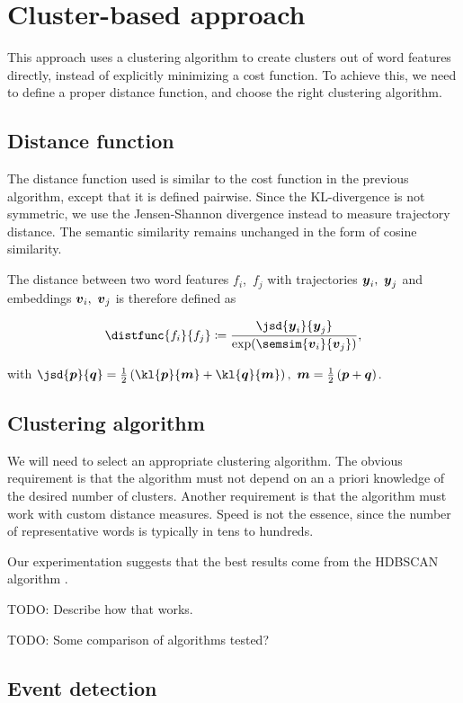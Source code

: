 \section{Cluster-based approach}
This approach uses a clustering algorithm to create clusters out of word features directly, instead of explicitly minimizing a cost function. To achieve this, we need to define a proper distance function, and choose the right clustering algorithm.

\subsection{Distance function}
The distance function used is similar to the cost function in the previous algorithm, except that it is defined pairwise. Since the KL-divergence is not symmetric, we use the Jensen-Shannon divergence instead to measure trajectory distance. The semantic similarity remains unchanged in the form of cosine similarity.

The distance between two word features $f_{i}$,\ $f_{j}$ with trajectories $\vect{\traj}_{i},\ \vect{\traj}_{j}$ and embeddings $\embed_{i},\ \embed_{j}$ is therefore defined as

\begin{equation}
	\distfunc{f_{i}}{f_{j}} \coloneqq \frac{\jsd{\vect{\traj}_{i}}{\vect{\traj}_{j}}}{\exp(\semsim{\embed_{i}}{\embed_{j}})},
\end{equation}

with $\jsd{\vect{p}}{\vect{q}} = \frac{1}{2} \left( \kl{\vect{p}}{\vect{m}} + \kl{\vect{q}}{\vect{m}} \right) ,\ \vect{m} = \frac{1}{2} \left( \vect{p} + \vect{q} \right)$.


\subsection{Clustering algorithm}
We will need to select an appropriate clustering algorithm. The obvious requirement is that the algorithm must not depend on an a priori knowledge of the desired number of clusters. Another requirement is that the algorithm must work with custom distance measures. Speed is not the essence, since the number of representative words is typically in tens to hundreds.

Our experimentation suggests that the best results come from the HDBSCAN algorithm \cite{hdbscan}.

{\color{red} TODO: Describe how that works.}

{\color{blue} TODO: Some comparison of algorithms tested?}


\subsection{Event detection}
